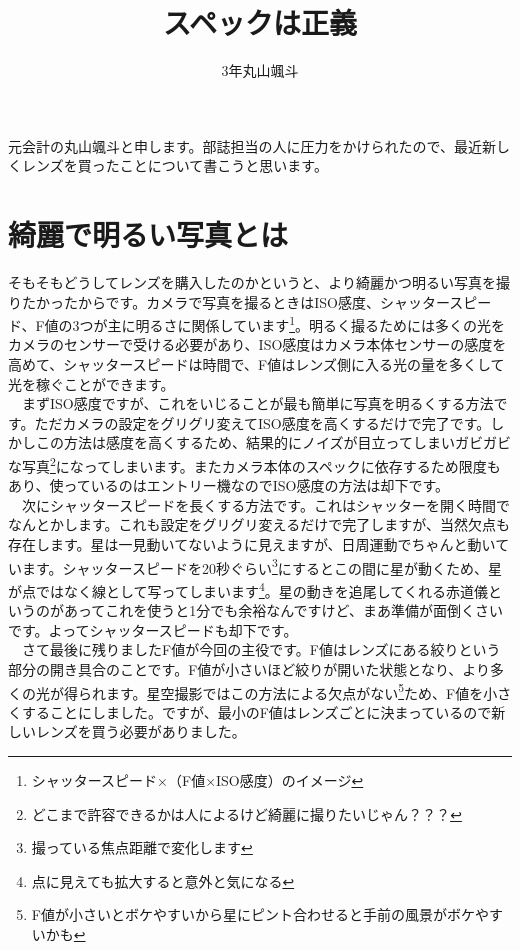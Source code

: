\documentclass[a4paper.10pt]{jarticle}
\begin{document}
\title{スペックは正義}
\author{3年丸山颯斗}
\date{}
\maketitle

元会計の丸山颯斗と申します。部誌担当の人に圧力をかけられたので、最近新しくレンズを買ったことについて書こうと思います。\\
\section{綺麗で明るい写真とは}
そもそもどうしてレンズを購入したのかというと、より綺麗かつ明るい写真を撮りたかったからです。カメラで写真を撮るときはISO感度、シャッタースピード、F値の3つが主に明るさに関係しています\footnote{シャッタースピード×（F値×ISO感度）のイメージ}。明るく撮るためには多くの光をカメラのセンサーで受ける必要があり、ISO感度はカメラ本体センサーの感度を高めて、シャッタースピードは時間で、F値はレンズ側に入る光の量を多くして光を稼ぐことができます。\\
　まずISO感度ですが、これをいじることが最も簡単に写真を明るくする方法です。ただカメラの設定をグリグリ変えてISO感度を高くするだけで完了です。しかしこの方法は感度を高くするため、結果的にノイズが目立ってしまいガビガビな写真\footnote{どこまで許容できるかは人によるけど綺麗に撮りたいじゃん？？？}になってしまいます。またカメラ本体のスペックに依存するため限度もあり、使っているのはエントリー機なのでISO感度の方法は却下です。\\
　次にシャッタースピードを長くする方法です。これはシャッターを開く時間でなんとかします。これも設定をグリグリ変えるだけで完了しますが、当然欠点も存在します。星は一見動いてないように見えますが、日周運動でちゃんと動いています。シャッタースピードを20秒ぐらい\footnote{撮っている焦点距離で変化します}にするとこの間に星が動くため、星が点ではなく線として写ってしまいます\footnote{点に見えても拡大すると意外と気になる}。星の動きを追尾してくれる赤道儀というのがあってこれを使うと1分でも余裕なんですけど、まあ準備が面倒くさいです。よってシャッタースピードも却下です。\\
　さて最後に残りましたF値が今回の主役です。F値はレンズにある絞りという部分の開き具合のことです。F値が小さいほど絞りが開いた状態となり、より多くの光が得られます。星空撮影ではこの方法による欠点がない\footnote{F値が小さいとボケやすいから星にピント合わせると手前の風景がボケやすいかも}ため、F値を小さくすることにしました。ですが、最小のF値はレンズごとに決まっているので新しいレンズを買う必要がありました。
\end{document}
